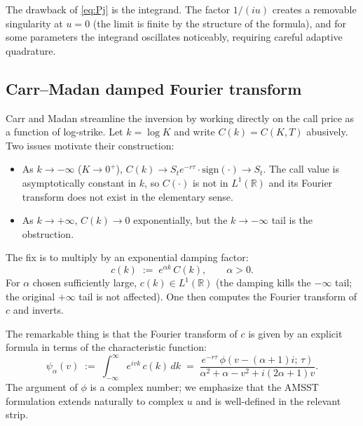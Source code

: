 \documentclass[11pt]{article}
\theoremstyle{plain}
\theoremstyle{definition}
\theoremstyle{remark}
\begin{document}
The drawback of \eqref{eq:Pj} is the integrand. The factor \(1/(iu)\) creates a removable singularity at \(u = 0\) (the limit is finite by the structure of the formula), and for some parameters the integrand oscillates noticeably, requiring careful adaptive quadrature.

\subsection{Carr--Madan damped Fourier transform}

Carr and Madan \cite{CarrMadan1999} streamline the inversion by working directly on the call price as a function of log-strike. Let \(k = \log K\) and write \(C(k) = C(K, T)\) abusively. Two issues motivate their construction:

\begin{itemize}[topsep=2pt]
    \item As \(k \to -\infty\) (\(K \to 0^+\)), \(C(k) \to S_t e^{-r\tau} \cdot \text{sign}(\cdot) \to S_t\). The call value is asymptotically constant in \(k\), so \(C(\cdot)\) is not in \(L^1(\mathbb{R})\) and its Fourier transform does not exist in the elementary sense.
    \item As \(k \to +\infty\), \(C(k) \to 0\) exponentially, but the \(k \to -\infty\) tail is the obstruction.
\end{itemize}

The fix is to multiply by an exponential damping factor:
\begin{equation}
    c(k) \;:=\; e^{\alpha k}\, C(k), \qquad \alpha > 0.                                              \label{eq:cm-damping}
\end{equation}
For \(\alpha\) chosen sufficiently large, \(c(k) \in L^1(\mathbb{R})\) (the damping kills the \(-\infty\) tail; the original \(+\infty\) tail is not affected). One then computes the Fourier transform of \(c\) and inverts.

The remarkable thing is that the Fourier transform of \(c\) is given by an explicit formula in terms of the characteristic function:
\begin{equation}
    \psi_\alpha(v) \;:=\; \int_{-\infty}^\infty e^{i v k}\, c(k)\, dk \;=\; \frac{e^{-r\tau}\, \phi\!\left(v - (\alpha + 1)i;\, \tau\right)}{\alpha^2 + \alpha - v^2 + i(2\alpha + 1) v}.                                       \label{eq:cm-psi}
\end{equation}
The argument of \(\phi\) is a complex number; we emphasize that the AMSST formulation extends naturally to complex \(u\) and is well-defined in the relevant strip.
\end{document}
